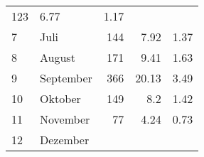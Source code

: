 \begin{longtable}{lXrrr}
       \num{123} &
       \num[round-mode=places,round-precision=2]{6.77} &
         \num[round-mode=places,round-precision=2]{1.17} \\

     7 &
     \multicolumn{1}{X}{ Juli   } &


       \num{144} &
       \num[round-mode=places,round-precision=2]{7.92} &
         \num[round-mode=places,round-precision=2]{1.37} \\

     8 &
     \multicolumn{1}{X}{ August   } &


       \num{171} &
       \num[round-mode=places,round-precision=2]{9.41} &
         \num[round-mode=places,round-precision=2]{1.63} \\

     9 &
     \multicolumn{1}{X}{ September   } &


       \num{366} &
       \num[round-mode=places,round-precision=2]{20.13} &
         \num[round-mode=places,round-precision=2]{3.49} \\

     10 &
     \multicolumn{1}{X}{ Oktober   } &


       \num{149} &
       \num[round-mode=places,round-precision=2]{8.2} &
         \num[round-mode=places,round-precision=2]{1.42} \\

     11 &
     \multicolumn{1}{X}{ November   } &


       \num{77} &
       \num[round-mode=places,round-precision=2]{4.24} &
         \num[round-mode=places,round-precision=2]{0.73} \\

     12 &
     \multicolumn{1}{X}{ Dezember   } &



\end{longtable}
